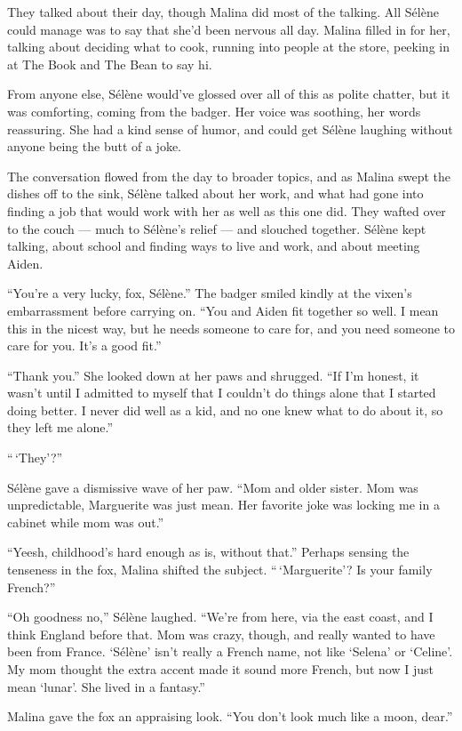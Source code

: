 They talked about their day, though Malina did most of the talking. All Sélène could manage was to say that she'd been nervous all day. Malina filled in for her, talking about deciding what to cook, running into people at the store, peeking in at The Book and The Bean to say hi.

From anyone else, Sélène would've glossed over all of this as polite chatter, but it was comforting, coming from the badger. Her voice was soothing, her words reassuring. She had a kind sense of humor, and could get Sélène laughing without anyone being the butt of a joke.

The conversation flowed from the day to broader topics, and as Malina swept the dishes off to the sink, Sélène talked about her work, and what had gone into finding a job that would work with her as well as this one did. They wafted over to the couch --- much to Sélène's relief --- and slouched together. Sélène kept talking, about school and finding ways to live and work, and about meeting Aiden.

``You're a very lucky, fox, Sélène.'' The badger smiled kindly at the vixen's embarrassment before carrying on. ``You and Aiden fit together so well. I mean this in the nicest way, but he needs someone to care for, and you need someone to care for you. It's a good fit.''

``Thank you.'' She looked down at her paws and shrugged. ``If I'm honest, it wasn't until I admitted to myself that I couldn't do things alone that I started doing better. I never did well as a kid, and no one knew what to do about it, so they left me alone.''

``\,`They'?''

Sélène gave a dismissive wave of her paw. ``Mom and older sister. Mom was unpredictable, Marguerite was just mean. Her favorite joke was locking me in a cabinet while mom was out.''

``Yeesh, childhood's hard enough as is, without that.'' Perhaps sensing the tenseness in the fox, Malina shifted the subject. ``\,`Marguerite'? Is your family French?''

``Oh goodness no,'' Sélène laughed. ``We're from here, via the east coast, and I think England before that. Mom was crazy, though, and really wanted to have been from France. `Sélène' isn't really a French name, not like `Selena' or `Celine'. My mom thought the extra accent made it sound more French, but now I just mean `lunar'. She lived in a fantasy.''

Malina gave the fox an appraising look. ``You don't look much like a moon, dear.''

